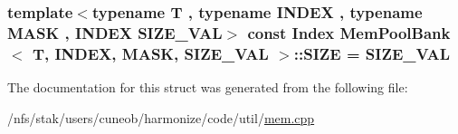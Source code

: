 \hypertarget{structMemPoolBank_afdb50a6709dbca571d8e3fee281ebb12}{
\subsubsection[{S\-I\-Z\-E}]{\setlength{\rightskip}{0pt plus 5cm}template$<$typename T , typename I\-N\-D\-E\-X , typename M\-A\-S\-K , I\-N\-D\-E\-X S\-I\-Z\-E\-\_\-\-V\-A\-L$>$ const {\bf Index} {\bf Mem\-Pool\-Bank}$<$ T, I\-N\-D\-E\-X, M\-A\-S\-K, S\-I\-Z\-E\-\_\-\-V\-A\-L $>$\-::S\-I\-Z\-E = S\-I\-Z\-E\-\_\-\-V\-A\-L\hspace{0.3cm}{\ttfamily [static]}}}\label{structMemPoolBank_afdb50a6709dbca571d8e3fee281ebb12}


The documentation for this struct was generated from the following file\-:\begin{DoxyCompactItemize}
\item 
/nfs/stak/users/cuneob/harmonize/code/util/\hyperlink{mem_8cpp}{mem.\-cpp}\end{DoxyCompactItemize}
